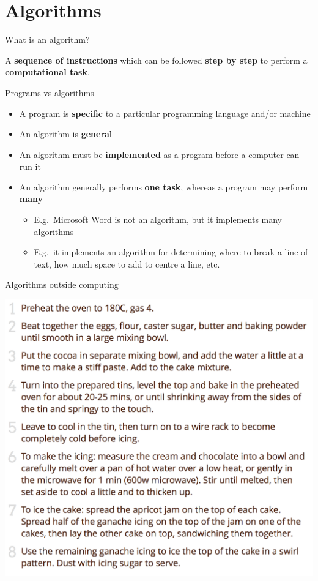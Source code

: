 \part{Algorithms}
\frame{\partpage}

\begin{frame}{What is an algorithm?}
	\pause\begin{center}
		A \textbf{sequence of instructions} which can be followed \textbf{step by step}
		to perform a \textbf{computational task}.
	\end{center}
\end{frame}

\begin{frame}{Programs vs algorithms}
	\begin{itemize}
		\pause\item A program is \textbf{specific} to a particular programming language and/or machine
		\pause\item An algorithm is \textbf{general}
		\pause\item An algorithm must be \textbf{implemented} as a program before a computer can run it
		\pause\item An algorithm generally performs \textbf{one task}, whereas a program may perform \textbf{many}
		\begin{itemize}
			\pause\item E.g.\ Microsoft Word is not an algorithm, but it implements many algorithms
			\pause\item E.g.\ it implements an algorithm for determining where to break a line of text,
				how much space to add to centre a line, etc.
		\end{itemize}
	\end{itemize}
\end{frame}

\begin{frame}{Algorithms outside computing}
	\begin{center}
		\includegraphics[height=0.8\textheight]{cake_recipe}
	\end{center}
\end{frame}

